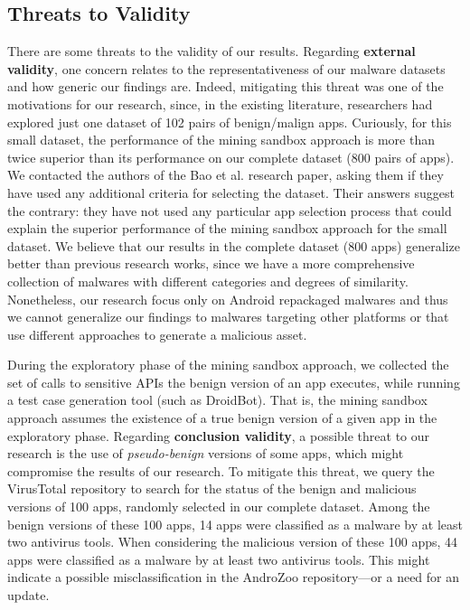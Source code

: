 \subsection{Threats to Validity}\label{sec:threats}


There are some threats to the validity of our results.
Regarding {\bf external validity}, one concern relates to the 
representativeness of our malware datasets and how generic our findings are.
Indeed, mitigating this threat was one of the motivations for our research,
since, in the existing literature, researchers had explored just
one dataset of 102 pairs of benign/malign apps. Curiously,
for this small dataset, the performance of the
mining sandbox approach is more than twice superior
than its performance on our complete dataset (800 pairs of
apps). We contacted the authors of the Bao et al. research paper, asking them
if they have used any additional criteria for selecting the
dataset. Their answers suggest the contrary: they have not used
any particular app selection process that
could explain the superior performance of the mining
sandbox approach for the small dataset. We believe that
our results in the complete dataset (800 apps) generalize better than previous research works,
since we have a more comprehensive collection of malwares with different
categories and degrees of similarity. Nonetheless, our
research focus only on Android repackaged malwares and thus we
cannot generalize our findings to malwares targeting
other platforms or that use different approaches to
generate a malicious asset.

During the exploratory phase of the mining sandbox approach,
we collected the set of calls to sensitive APIs the benign version of
an app executes, while running a test case generation tool (such as
DroidBot). That is, the mining sandbox approach assumes the existence of a true benign
version of a given app in the exploratory phase. Regarding {\bf conclusion validity}, a
possible threat to our research is the use of \emph{pseudo-benign} versions
of some apps, which might compromise the results of our research.
To mitigate this threat, we query the VirusTotal repository to search for the
status of the benign and malicious versions of 100 apps,
randomly selected in our complete dataset. Among the benign
versions of these 100 apps, 14 apps were classified as a malware 
by at least two antivirus tools. When considering
the malicious version of these 100 apps, 44 apps were
classified as a malware by at least two antivirus tools. This might indicate
a possible misclassification in the AndroZoo repository---or a need
for an update. 

